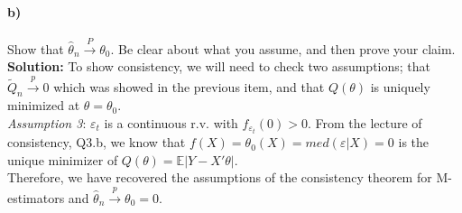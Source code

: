 \documentclass[11pt,letterpaper]{article}                  %
\begin{document}
\begin{problem}
\paragraph{b)} Show that $\widehat{\theta}_n\overset{P}{\rightarrow}\theta_0$. Be clear about what you assume, and then prove your claim.\\

\textbf{Solution:} To show consistency, we will need to check two assumptions; that $\tilde{Q}_n \overset{p}{\rightarrow}0$ which was showed in the previous item, and that $Q(\theta)$ is uniquely minimized at $\theta=\theta_0$.\\
\textit{Assumption 3}: $\varepsilon_t$ is a continuous r.v. with $f_{\varepsilon_t}(0)>0$. From the lecture of consistency, Q3.b, we know that $f(X)=\theta_0(X)=med(\varepsilon|X)=0$ is the unique minimizer of $Q(\theta)=\mathbb{E}|Y-X'\theta|$.\\
Therefore, we have recovered the assumptions of the consistency theorem for M-estimators and $\hat{\theta}_n\overset{p}{\rightarrow}{\theta_0}=0$.
\end{problem}
\end{document}
